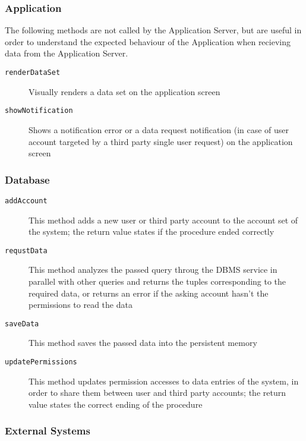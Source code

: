 \documentclass[../DD0.tex]{subfiles}
\begin{document}
    \subsubsection{Application}

      The following methods are not called by the Application Server, but are useful in order to understand the expected behaviour of the Application when recieving data from the Application Server.

      \begin{description}
        \item[\texttt{renderDataSet}] Visually renders a data set on the application screen
        \item[\texttt{showNotification}] Shows a notification error or a data request notification (in case of user account targeted by a third party single user request) on the application screen
      \end{description}

    \subsubsection{Database}

      \begin{description}
        \item[\texttt{addAccount}] This method adds a new user or third party account to the account set of the system; the return value states if the procedure ended correctly
        \item[\texttt{requstData}] This method analyzes the passed query throug the DBMS service in parallel with other queries and returns the tuples corresponding to the required data, or returns an error if the asking account hasn't the permissions to read the data
        \item[\texttt{saveData}] This method saves the passed data into the persistent memory
        \item[\texttt{updatePermissions}] This method updates permission accesses to data entries of the system, in order to share them between user and third party accounts; the return value states the correct ending of the procedure
      \end{description}

    \subsubsection{External Systems}
\end{document}
